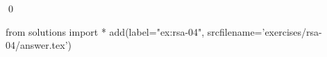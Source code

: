 
\begin{ex} 
  \label{ex:rsa-04}
  
  \qed
\end{ex} 
\begin{python0}
from solutions import *
add(label="ex:rsa-04",
    srcfilename='exercises/rsa-04/answer.tex') 
\end{python0}
